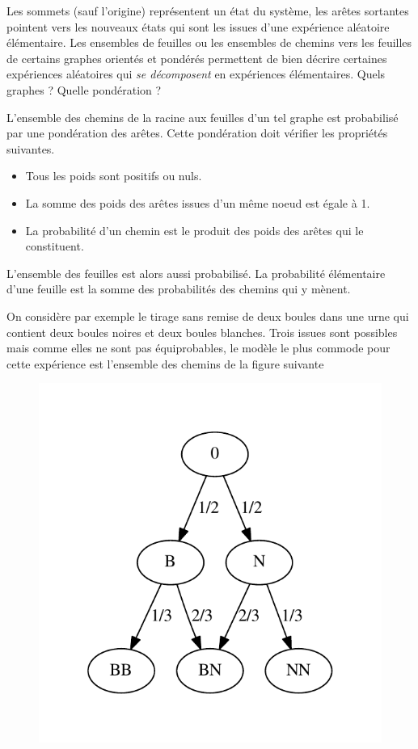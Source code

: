 Les sommets (sauf l'origine) représentent un état du système, les arêtes sortantes pointent vers les nouveaux états qui sont les issues d'une expérience aléatoire élémentaire.  Les ensembles de feuilles ou les ensembles de chemins vers les feuilles de certains graphes orientés et pondérés permettent de bien décrire certaines expériences aléatoires qui \emph{se décomposent} en expériences élémentaires.
Quels graphes ? Quelle pondération ?
\begin{defi}
  L'ensemble des chemins de la racine aux feuilles d'un tel graphe est probabilisé par une pondération des arêtes. Cette pondération doit vérifier les propriétés suivantes.
\begin{itemize}
  \item Tous les poids sont positifs ou nuls.
  \item La somme des poids des arêtes issues d'un même noeud est égale à 1.
  \item La probabilité d'un chemin est le produit des poids des arêtes qui le constituent.
\end{itemize}
 L'ensemble des feuilles est alors aussi probabilisé. La probabilité élémentaire d'une feuille est la somme des probabilités des chemins qui y mènent.
\end{defi}

On considère par exemple le tirage sans remise de deux boules dans une urne qui contient deux boules noires et deux boules blanches. Trois issues sont possibles mais comme elles ne sont pas équiprobables, le modèle le plus commode pour cette expérience est l'ensemble des chemins de la figure suivante
\begin{figure}[h!]
 \centering
 \includegraphics{./C9646_1.pdf}
\end{figure}

